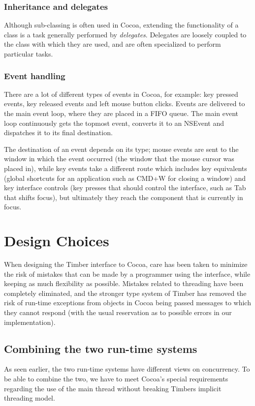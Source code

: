 \documentclass[a4paper]{article}
\begin{document}
\subsubsection*{Inheritance and delegates}
Although sub-classing is often used in Cocoa, extending the functionality of a class is a task generally performed by \textit{delegates}. Delegates are loosely coupled to the class with which they are used, and are often specialized to perform particular tasks.

\subsubsection*{Event handling}
There are a lot of different types of events in Cocoa, for example: key pressed events, key released events and left mouse button clicks. Events are delivered to the main event loop, where they are placed in a FIFO queue. The main event loop continuously gets the topmost event, converts it to an NSEvent and dispatches it to its final destination.

The destination of an event depends on its type; mouse events are sent to the window in which the event occurred (the window that the mouse cursor was placed in), while key events take a different route which includes key equivalents (global shortcuts for an application such as CMD+W for closing a window) and key interface controls (key presses that should control the interface, such as Tab that shifts focus), but ultimately they reach the component that is currently in focus. 

\section{Design Choices}
When designing the Timber interface to Cocoa, care has been taken to minimize the risk of mistakes that can be made by a programmer using the interface, while keeping as much flexibility as possible.  Mistakes related to threading have been completely eliminated, and the stronger type system of Timber has removed the risk of run-time exceptions from objects in Cocoa being passed messages to which they cannot respond (with the usual reservation as to possible errors in our implementation).

\subsection{Combining the two run-time systems}
As seen earlier, the two run-time systems have different views on concurrency. To be able to combine the two, we have to meet Cocoa's special requirements regarding the use of the main thread without breaking Timbers implicit threading model.
\end{document}
